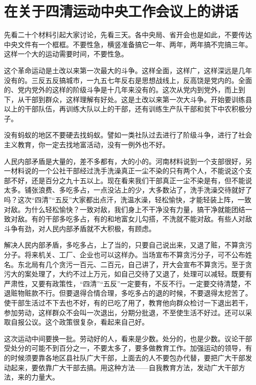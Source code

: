 \section[在关于四清运动中央工作会议上的讲话（一九六三年五月）]{在关于四清运动中央工作会议上的讲话}


先看二十个材料引起大家讨论，先看三天。各中央局、省开会也是如此，不要传达中央文件有一个框框。不要性急，横竖准备搞它一年、两年，两年搞不完搞三年。这样一个大的运动需要时间，不要性急。

这个革命运动是土改以来第一次最大的斗争。这样全面，这样广，这样深远是几年没有的。三反五反搞城市，一九五七年反右是思想战线上，反高饶是党内的。全面的、党内党外的这样的阶级斗争是十几年来没有的。这次从党内到党外，而上到下，从干部到群众，这样理解有好处。这是土改以来第一次大斗争。开始要训练县以上的干部队伍，再训练大队以上的干部，还有训练生产队干部和贫下中农积极分子。

没有蚂蚁的地区不要硬去找蚂蚁。譬如一类社队过去进行了阶级斗争，进行了社会主义教育，你一定去找地富活动，没有一例外也不好。

人民内部矛盾是大量的，差不多都有，大的小的。河南材料说到一个支部很好，另一材料说的一个公社干部经过洗手洗澡真正一尘不染的只有两个人，不能说这个支部不好，还是百分之九十五以上。现在看来我们干部真正一尘不染是有，但不能说太多。铺张浪费、多吃多占，一点没沾上的少，大多数沾了，洗手洗澡交待就好了吗？这次“四清”“五反”大家都出点汗，洗温水澡，轻松愉快，才能轻装上阵，一致对敌。为什么轻松愉快？一致对敌，我们身上不干净没有力量，搞干净就能团结一致对敌。有的干部多吃多占，有的和地富女儿勾搭，不洗就不能对敌。有些人对敌斗争有劲，对人民内部矛盾就不大积极，有顾虑。

解决人民内部矛盾，多吃多占，上了当的，只要自己说出来，又退了赃，不算贪污分子。将来机关、工厂、企业也可以这样办。当场宣布不算贪污分子，可不公布姓名。东北局有几个贪污一百元、二百元，自己讲了，开大会宣布不算贪污。至于贪污大的案处理了，大约不过上万元，如自己交待了又退了，处理可以减轻。既要有严肃性，又要有政策性，“四清”“五反”一定要有，不反不行。一定要交待清楚，不退赃物赃款不行。但要退得合情合理，多吃多占的退的时候，不要退得太挖苦了。使干部生活过不下去也不好，有的已吃了用了，教育他向群众检讨一下退出若干，参加劳动，这样群众不会叫一次退出，分期分批退，不至使生活不好过。还可以采取自报公议。这个政策很复杂，看起来自己好。

这次运动中间要换一批。劳动好的人，看来是少数。处分的，也是少数。议论干部受处分的可能不到百分之一，不要太多了，要多做教育工作。加强运动的领导，有的时候须要靠各地区县社队广大干部，上面去的人不要包办代替，要把广大干部发动起来，要依靠广大干部去搞。用这种方法——自我教育方法，发动广大干部方法，来的力量大。

